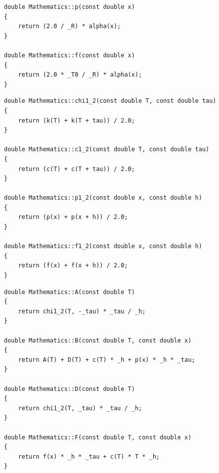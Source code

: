 \begin{lstlisting}[caption=Замены p и f]
double Mathematics::p(const double x)
{
    return (2.0 / _R) * alpha(x);
}

double Mathematics::f(const double x)
{
    return (2.0 * _T0 / _R) * alpha(x);
}
\end{lstlisting}

\begin{lstlisting}[caption=Метод средних для всех функций]
double Mathematics::chi1_2(const double T, const double tau)
{
    return (k(T) + k(T + tau)) / 2.0;
}

double Mathematics::c1_2(const double T, const double tau)
{
    return (c(T) + c(T + tau)) / 2.0;
}

double Mathematics::p1_2(const double x, const double h)
{
    return (p(x) + p(x + h)) / 2.0;
}

double Mathematics::f1_2(const double x, const double h)
{
    return (f(x) + f(x + h)) / 2.0;
}
\end{lstlisting}

\begin{lstlisting}[caption=Параметры разностной схемы]
double Mathematics::A(const double T)
{
    return chi1_2(T, -_tau) * _tau / _h;
}

double Mathematics::B(const double T, const double x)
{
    return A(T) + D(T) + c(T) * _h + p(x) * _h * _tau;
}

double Mathematics::D(const double T)
{
    return chi1_2(T, _tau) * _tau / _h;
}

double Mathematics::F(const double T, const double x)
{
    return f(x) * _h * _tau + c(T) * T * _h;
}
\end{lstlisting}

